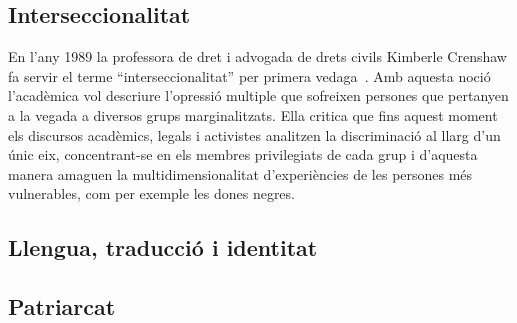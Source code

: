\begin{comment}
""Aquests nou[sic!] catalans parles català, el van aprendre sense adonar-se'n. Molts el parles de manera natural i quotidiana, perquè sí, i altres per afany de sentir-se catalans de debò"" (p.17)

""Parlen un català gruixut, groller i vulgar[...] Desconeixen la gramàtica catalana. No saben llegir en aquest idioma. Escriure'l, encara menys. Però no n'hi ha per a escandaltzar-se'n. Infinitat de catalans d'origen, que s'expressen en català, que parlen en català i que viuen en català, llegiexen en castellà i escriuen les seves cartes en castellà."" (p.18)

""Tota aquesta gent no s'adona de la seva aclimatació. "Són" catalans fins a cert punt. "No" són catalans, també fins a cert punt. No és una qüestió d'honor ni de principis."" (p.19)

"Aquells immigrants murcians no havien arribat a Catalunya com a colonitzadors. Tampoc, o molt febement, com a invasors o peoners. Havien vingut a treballar i a menjar, senzillament, perquè a la seva terra es morien de gana [...] Avui dia, tots s'han integrat, i alguns, ultrapassant o sobrepujant aquesta integració, s'han tornat furibunds catalanistes. [...] Aquesta esperiència pot demostrar o permetre d'esperar que amb els immigrants d'ara passarà el mateixo poc més o menys." (p.32)

"el que passa és que no acabem de decidir-nos a anomenar catalans els qui han nascut aquí de pares de fora" (p.34)

\end{comment}

\subsection{Interseccionalitat}
En l'any 1989 la professora de dret i advogada de drets civils Kimberle Crenshaw fa servir el terme ``interseccionalitat'' per primera vedaga~\autocite{Crenshaw1989}.
Amb aquesta noció l'acadèmica vol descriure l'opressió multiple que sofreixen persones que pertanyen a la vegada a diversos grups marginalitzats.
Ella critica que fins aquest moment els discursos acadèmics, legals i activistes analitzen la discriminació al llarg d'un únic eix,
concentrant-se en els membres privilegiats de cada grup i d'aquesta manera amaguen la multidimensionalitat d'experiències de les persones més vulnerables, com per exemple les dones negres.

\subsection{Llengua, traducció i identitat}

\subsection{Patriarcat}

\begin{comment}
2) Basics
   ** la immigració a Catalunya
   ** interseccionalitat -- Crenshaw
   ** llengua?
   ** identitat?
   ** Laurie Penny (chapter 2)
\end{comment}
